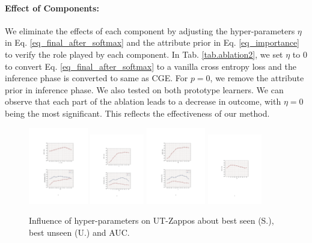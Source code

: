 \documentclass[letterpaper]{article} %
\theoremstyle{definition}
\begin{document}
\paragraph{Effect of Components:}
We eliminate the effects of each component by adjusting the hyper-parameters $\eta$ in Eq. \ref{eq_final_after_softmax} and the attribute prior in Eq. \ref{eq_importance} to verify the role played by each component. In Tab. \ref{tab.ablation2}, we set $\eta$ to 0 to convert Eq. \ref{eq_final_after_softmax} to a vanilla cross entropy loss and the inference phase is converted to same as CGE. For $p=0$, we remove the attribute prior in inference phase. We also tested on both prototype learners. We can observe that each part of the ablation leads to a decrease in outcome, with $\eta=0$ being the most significant. This reflects the effectiveness of our method.


  \begin{figure}[t]
	\centering
		\subfigure
		{
			\includegraphics[width=0.23\textwidth]{ FIG_HYPER_1.pdf}
		}
  		\subfigure
		{
			\includegraphics[width=0.21\textwidth]{ FIG_HYPER_2bpdf.pdf}
		}
  		\subfigure
		{
			\includegraphics[width=0.23\textwidth]{ FIG_HYPER_3.pdf}
		}
  		\subfigure
		{
			\includegraphics[width=0.21\textwidth]{ FIG_HYPER_4b.pdf}
		}
	\caption{Influence of hyper-parameters on UT-Zappos about best seen (S.), best unseen (U.) and AUC.}
	\label{fig_hyper}
\end{figure}
\end{document}
